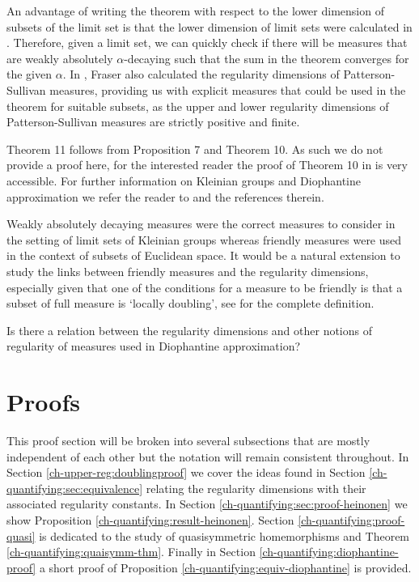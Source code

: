 An advantage of writing the theorem with respect to the lower dimension of subsets of the limit set is that the lower dimension of limit sets were calculated in \cite{fraser2}. Therefore, given a limit set, we can quickly check if there will be measures that are weakly absolutely $\alpha$-decaying such that the sum in the theorem converges for the given $\alpha$. In \cite{fraser2}, Fraser also calculated the regularity dimensions of Patterson-Sullivan measures, providing us with explicit measures that could be used in the theorem for suitable subsets, as the upper and lower regularity dimensions of Patterson-Sullivan measures are strictly positive and finite. 

Theorem 11 follows from Proposition 7 and Theorem 10. As such we do not provide a proof here, for the interested reader the proof of Theorem 10 in \cite{beres-sanju-al} is very accessible. For further information on Kleinian groups and Diophantine approximation we refer the reader to \cite{beres-sanju-al, fraser2} and the references therein.

Weakly absolutely decaying measures were the correct measures to consider in the setting of limit sets of Kleinian groups whereas friendly measures were used in the context of subsets of Euclidean space. It would be a natural extension to study the links between friendly measures and the regularity dimensions, especially given that one of the conditions for a measure to be friendly is that a subset of full measure is `locally doubling', see \cite{friendly} for the complete definition.  

\begin{question}
Is there a relation between the regularity dimensions and other notions of regularity of measures used in Diophantine approximation?
\end{question}



\section{Proofs}


This proof section will be broken into several subsections that are mostly independent of each other but the notation will remain consistent throughout. In Section \ref{ch-upper-reg:doublingproof} we cover the ideas found in Section \ref{ch-quantifying:sec:equivalence} relating the regularity dimensions with their associated regularity constants. In Section \ref{ch-quantifying:sec:proof-heinonen} we show Proposition \ref{ch-quantifying:result-heinonen}. Section \ref{ch-quantifying:proof-quasi} is dedicated to the study of quasisymmetric homemorphisms and Theorem \ref{ch-quantifying:quaisymm-thm}. Finally in Section \ref{ch-quantifying:diophantine-proof} a short proof of Proposition \ref{ch-quantifying:equiv-diophantine} is provided.


